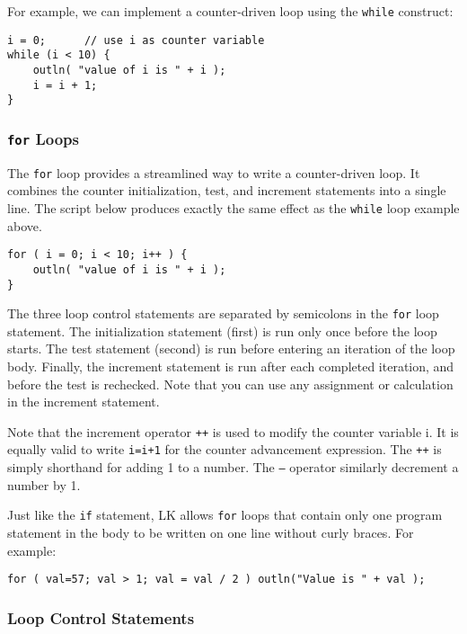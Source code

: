 \documentclass{article}
\begin{document}
For example, we can implement a counter-driven loop using the \texttt{while} construct:

\begin{verbatim}
i = 0;      // use i as counter variable
while (i < 10) {
    outln( "value of i is " + i );
    i = i + 1;
}
\end{verbatim}

\subsubsection{\texttt{for} Loops}

The \texttt{for} loop provides a streamlined way to write a counter-driven loop.  It combines the counter initialization, test, and increment statements into a single line.  The script below produces exactly the same effect as the \texttt{while} loop example above.

\begin{verbatim}
for ( i = 0; i < 10; i++ ) {
    outln( "value of i is " + i );
}
\end{verbatim}

The three loop control statements are separated by semicolons in the \texttt{for} loop statement.  The initialization statement (first) is run only once before the loop starts.  The test statement (second) is run before entering an iteration of the loop body.  Finally, the increment statement is run after each completed iteration, and before the test is rechecked.  Note that you can use any assignment or calculation in the increment statement.

Note that the increment operator \texttt{++} is used to modify the counter variable i.  It is equally valid to write \texttt{i=i+1} for the counter advancement expression.  The \texttt{++} is simply shorthand for adding 1 to a number.  The \texttt{--} operator similarly decrement a number by 1.

Just like the \texttt{if} statement, LK allows \texttt{for} loops that contain only one program statement in the body to be written on one line without curly braces.  For example:

\begin{verbatim}
for ( val=57; val > 1; val = val / 2 ) outln("Value is " + val );
\end{verbatim}

\subsubsection{Loop Control Statements}
\end{document}
